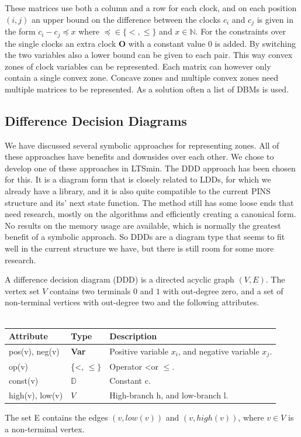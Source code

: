 \documentclass[11pt]{article}
\begin{document}
These matrices use both a column and a row for each clock, and on each position $(i,j)$ an upper bound on the difference between the clocks $c_i$ and $c_j$ is given in the form $c_i - c_j \preceq x$ where $\preceq \in \{<, \leq\}$ and $x \in \mathbb{N}$. For the constraints over the single clocks an extra clock $\mathbf{O}$ with a constant value 0 is added. By switching the two variables also a lower bound can be given to each pair. This way convex zones of clock variables can be represented. Each matrix can however only contain a single convex zone. Concave zones and multiple convex zones need multiple matrices to be represented. As a solution often a list of DBMs is used. 

\subsection{Difference Decision Diagrams}

We have discussed several symbolic approaches for representing zones. All of these approaches have benefits and downsides over each other. We chose to develop one of these approaches in LTSmin. The DDD approach has been chosen for this. It is a diagram form that is closely related to LDDs, for which we already have a library, and it is also quite compatible to the current PINS structure and its' next state function. The method still has some loose ends that need research, mostly on the algorithms and efficiently creating a canonical form. No results on the memory usage are available, which is normally the greatest benefit of a symbolic approach. So DDDs are a diagram type that seems to fit well in the current structure we have, but there is still room for some more research.

\begin{mydef}
\label{def:DDD}
A difference decision diagram (DDD) is a directed acyclic graph $(V,E)$. The vertex set $V$ contains two terminals $0$ and $1$ with out-degree zero, and a set of non-terminal vertices with out-degree two and the following attributes.
\\\\
\begin{tabular}{lll}
Attribute                & Type                      & Description                                           \\\hline
pos(v), neg(v)           & \textbf{Var}              & Positive variable $x_i$, and negative variable $x_j$. \\
op(v)                    & \{\textless, $\leq\}$     & Operator \textless or $\leq$.                         \\
const(v)                 & $\mathbb{D}$              & Constant c.                                           \\
high(v), low(v)          & $V$                       & High-branch h, and low-branch l.                   
\end{tabular}
The set E contains the edges $(v,low(v))$ and $(v, high(v))$, where $v \in V$ is a non-terminal vertex.
\end{mydef}
\end{document}
